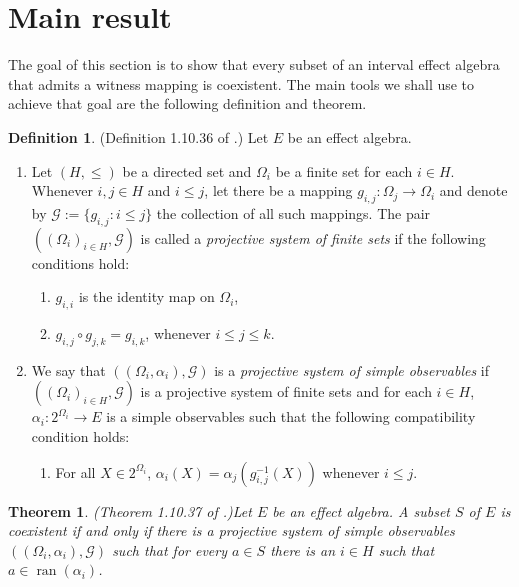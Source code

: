 \documentclass[letterpaper]{amsart}
\newtheorem{theorem}{Theorem}
\theoremstyle{definition}
\newtheorem{definition}{Definition}
\DeclareMathOperator*\ran{ran}
\begin{document}
\section{Main result}

The goal of this section is to show that every subset of an interval effect algebra that
admits a witness mapping is coexistent. The main tools we shall use 
to achieve that goal are the following definition and theorem.

\begin{definition}\label{def:projective}(Definition 1.10.36 of \cite{DvuPul:NTiQS}.)
Let $E$ be an effect algebra.
\begin{enumerate}
\item[(a)]
Let $(H,\leq)$ be a directed set and $\Omega_i$ be a finite set for each $i\in H$.
Whenever $i,j\in H$ and $i\leq j$, let there be a mapping $g_{i,j}:\Omega_j\to\Omega_i$ and
denote by $\mathcal G:=\{g_{i,j}:i\leq j\}$ the collection of all such mappings.
The pair $((\Omega_i)_{i\in H},\mathcal G)$ is called a {\em projective system of finite sets} if the following conditions hold:
\begin{enumerate}
\item[(i)]
	$g_{i,i}$ is the identity map on $\Omega_i$,
\item[(ii)]
	$g_{i,j}\circ g_{j,k}=g_{i,k}$, whenever $i\leq j\leq k$.
\end{enumerate}
\item[(b)]
We say that $((\Omega_i,\alpha_i),\mathcal G)$ is a {\em projective system of simple observables}
if $((\Omega_i)_{i\in H},\mathcal G)$ is a projective system of finite sets and for each
$i\in H$, $\alpha_i:2^{\Omega_i}\to E$ is a simple observables such that
the following compatibility condition holds:
\begin{enumerate}
\item[(iii)] For all $X\in 2^{\Omega_i}$, $\alpha_i(X)=\alpha_{j}(g_{i,j}^{-1}(X))$ whenever $i\leq j$. 
\end{enumerate}
\end{enumerate}
\end{definition}

\begin{theorem}(Theorem 1.10.37 of \cite{DvuPul:NTiQS}.)\label{thm:projective}
Let $E$ be an effect algebra. A subset $S$ of $E$ is coexistent if and only if there is
a projective system of simple observables $((\Omega_i,\alpha_i),\mathcal G)$ such that
for every $a\in S$ there is an $i\in H$ such that $a\in\ran(\alpha_i)$.
\end{theorem}
\end{document}
